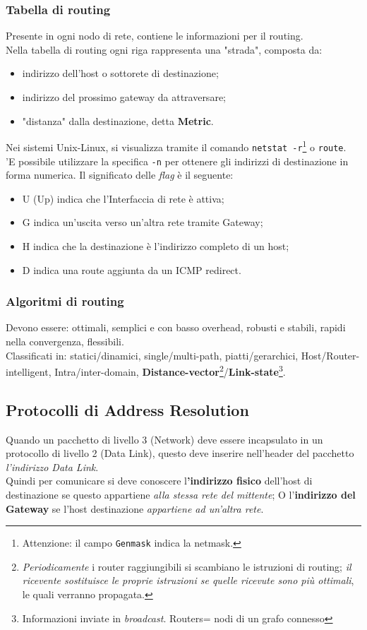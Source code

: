 \documentclass[a4paper,11pt]{article}
\def\code#1{\texttt{#1}}
\def\italic#1{\textit{#1}}
\begin{document}
\subsubsection{Tabella di routing}
Presente in ogni nodo di rete, contiene le informazioni per il routing.\\
Nella tabella di routing ogni riga rappresenta una "strada", composta da:
\begin{itemize}
\item indirizzo dell'host o sottorete di destinazione;
\item indirizzo del prossimo gateway da attraversare;
\item "distanza" dalla destinazione, detta \textbf{Metric}.
\end{itemize}
Nei sistemi Unix-Linux, si visualizza tramite il comando \code{netstat -r}\footnote{Attenzione: il campo \code{Genmask} indica la netmask.} o \code{route}.
\\'E possibile utilizzare la specifica \code{-n} per ottenere gli indirizzi di destinazione in forma numerica.
Il significato delle \italic{flag} è il seguente:
\begin{itemize}
\item U (Up) indica che l'Interfaccia di rete è attiva;
\item G indica un'uscita verso un'altra rete tramite Gateway;
\item H indica che la destinazione è l'indirizzo completo di un host;
\item D indica una route aggiunta da un ICMP redirect.
\end{itemize} 

\subsubsection{Algoritmi di routing}
Devono essere: ottimali, semplici e con basso overhead, robusti e stabili, rapidi nella convergenza, flessibili.\\
Classificati in: statici/dinamici, single/multi-path, piatti/gerarchici, Host/Router-intelligent, Intra/inter-domain, \textbf{Distance-vector}\footnote{\textit{Periodicamente} i router raggiungibili si scambiano le istruzioni di routing; \textit{il ricevente sostituisce le proprie istruzioni se quelle ricevute sono più ottimali}, le quali verranno propagata.}/\textbf{Link-state}\footnote{Informazioni inviate in \textit{broadcast}. Routers= nodi di un grafo connesso}.

 \subsection{Protocolli di Address Resolution}
 Quando un pacchetto di livello 3 (Network) deve essere incapsulato in un protocollo di livello 2 (Data Link), questo deve inserire nell'header del pacchetto \textit{l'indirizzo Data Link}. \\Quindi per comunicare si deve conoscere l\textbf{'indirizzo fisico} dell'host di destinazione se questo appartiene\textit{ alla stessa rete del mittente}; O l'\textbf{indirizzo del Gateway} se l'host destinazione \textit{appartiene ad un'altra rete}.
\end{document}
